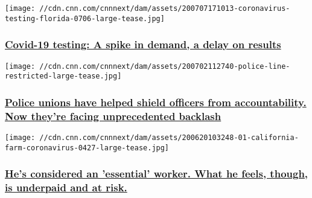 \href{/2020/07/07/politics/coronavirus-testing-delays-invs/index.html}{}

\texttt{[image: //cdn.cnn.com/cnnnext/dam/assets/200707171013-coronavirus-testing-florida-0706-large-tease.jpg]}

\hypertarget{covid-19-testing-a-spike-in-demand-a-delay-on-results}{%
\subsubsection{\texorpdfstring{\href{/2020/07/07/politics/coronavirus-testing-delays-invs/index.html}{Covid-19
testing: A spike in demand, a delay on
results}}{Covid-19 testing: A spike in demand, a delay on results}}\label{covid-19-testing-a-spike-in-demand-a-delay-on-results}}

\href{/2020/07/02/us/police-unions-contracts-shielding-bad-cops-invs/index.html}{}

\texttt{[image: //cdn.cnn.com/cnnnext/dam/assets/200702112740-police-line-restricted-large-tease.jpg]}

\hypertarget{police-unions-have-helped-shield-officers-from-accountability-now-theyre-facing-unprecedented-backlash-}{%
\subsubsection{\texorpdfstring{\href{/2020/07/02/us/police-unions-contracts-shielding-bad-cops-invs/index.html}{Police
unions have helped shield officers from accountability. Now they're
facing unprecedented backlash
}}{Police unions have helped shield officers from accountability. Now they're facing unprecedented backlash }}\label{police-unions-have-helped-shield-officers-from-accountability-now-theyre-facing-unprecedented-backlash-}}

\href{/2020/06/26/us/farmworker-coronavirus-invs/index.html}{}

\texttt{[image: //cdn.cnn.com/cnnnext/dam/assets/200620103248-01-california-farm-coronavirus-0427-large-tease.jpg]}

\hypertarget{hes-considered-an-essential-worker-what-he-feels-though-is-underpaid-and-at-risk-1}{%
\subsubsection{\texorpdfstring{\href{/2020/06/26/us/farmworker-coronavirus-invs/index.html}{He's
considered an 'essential' worker. What he feels, though, is underpaid
and at
risk.}}{He's considered an 'essential' worker. What he feels, though, is underpaid and at risk.}}\label{hes-considered-an-essential-worker-what-he-feels-though-is-underpaid-and-at-risk-1}}

